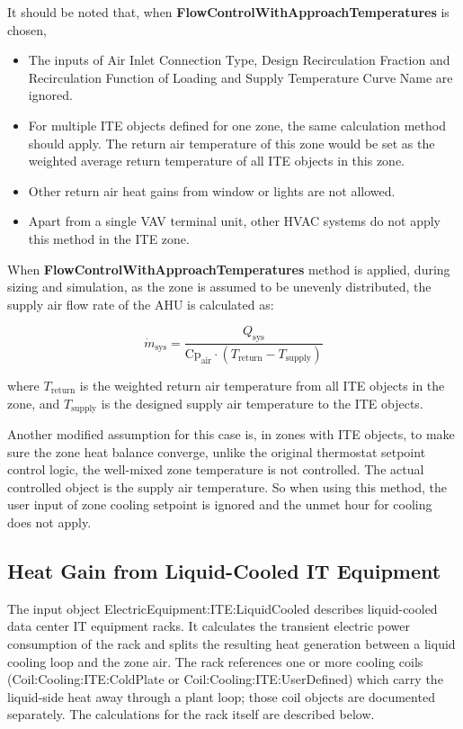 It should be noted that, when \textbf{FlowControlWithApproachTemperatures} is chosen,

\begin{itemize}
\item The inputs of Air Inlet Connection Type, Design Recirculation Fraction and Recirculation Function of Loading and Supply Temperature Curve Name are ignored.
\item For multiple ITE objects defined for one zone, the same calculation method should apply. The return air temperature of this zone would be set as the weighted average return temperature of all ITE objects in this zone.
\item Other return air heat gains from window or lights are not allowed.
\item Apart from a single VAV terminal unit, other HVAC systems do not apply this method in the ITE zone.
\end{itemize}

When \textbf{FlowControlWithApproachTemperatures} method is applied, during sizing and simulation, as the zone is assumed to be unevenly distributed, the supply air flow rate of the AHU is calculated as:

\begin{equation}
{\dot m_{\textrm{sys}}} = \frac{Q_{\textrm{sys}}}{\textrm{Cp}_{\textrm{air}} \cdot (T_{\textrm{return}} - T_{\textrm{supply}})}
\end{equation}

where $T_{\textrm{return}}$ is the weighted return air temperature from all ITE objects in the zone, and $T_{\textrm{supply}}$ is the designed supply air temperature to the ITE objects.

Another modified assumption for this case is, in zones with ITE objects, to make sure the zone heat balance converge, unlike the original thermostat setpoint control logic, the well-mixed zone temperature is not controlled. The actual controlled object is the supply air temperature. So when using this method, the user input of zone cooling setpoint is ignored and the unmet hour for cooling does not apply.

\subsection{Heat Gain from Liquid-Cooled IT Equipment}\label{heat-gain-from-liquid-cooled-it-equipment}

The input object ElectricEquipment:ITE:LiquidCooled describes liquid-cooled data center IT equipment racks. It calculates the transient electric power consumption of the rack and splits the resulting heat generation between a liquid cooling loop and the zone air. The rack references one or more cooling coils (Coil:Cooling:ITE:ColdPlate or Coil:Cooling:ITE:UserDefined) which carry the liquid-side heat away through a plant loop; those coil objects are documented separately. The calculations for the rack itself are described below.

